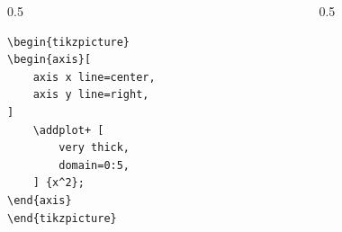 \documentclass[12pt,aspectratio=169,ignorenonframetext]{ltxbeamer}
\begin{document}
\begin{frame}[fragile]
\bigskip

\begin{columns}
    \begin{column}{0.5\textwidth}
        \begin{verbatim}
\begin{tikzpicture}
\begin{axis}[
    axis x line=center,
    axis y line=right,
]
    \addplot+ [
        very thick,
        domain=0:5,
    ] {x^2};
\end{axis}
\end{tikzpicture}
        \end{verbatim}
    \end{column}
    {\color{gray} \vline}
    \begin{column}{0.5\textwidth}
        \lmr
    \end{column}
\end{columns}
\end{frame}
\end{document}

